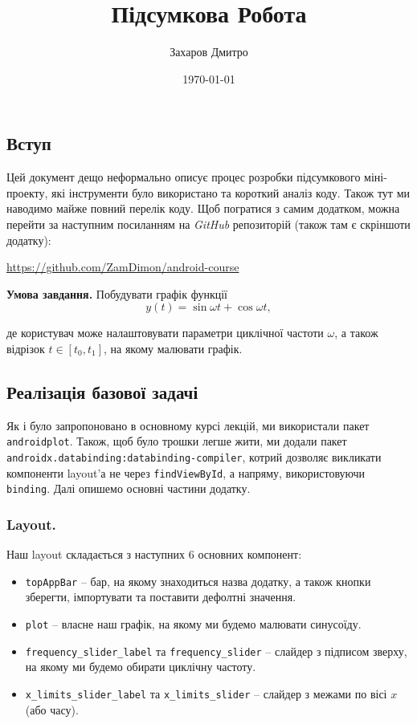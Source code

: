 \documentclass[oneside,solution]{android-assign}
\title{Підсумкова Робота}
\author{Захаров Дмитро}
\date{\today}
\begin{document}
\maketitle

\subsection{Вступ} Цей документ дещо неформально описує процес розробки підсумкового міні-проекту, які інструменти було використано та короткий аналіз коду. Також тут ми наводимо майже повний перелік коду. Щоб погратися з самим додатком, можна перейти за наступним посиланням на \textit{GitHub} репозиторій (також там є скріншоти додатку):

\begin{center}
\url{https://github.com/ZamDimon/android-course}
\end{center}

\textbf{Умова завдання.} Побудувати графік функції
\begin{equation*}
    y(t) = \sin \omega t + \cos \omega t,
\end{equation*}

де користувач може налаштовувати параметри циклічної частоти $\omega$, а також відрізок $t \in [t_0,t_1]$, на якому малювати графік.

\subsection{Реалізація базової задачі}

Як і було запропоновано в основному курсі лекцій, ми використали пакет \texttt{androidplot}. Також, щоб було трошки легше жити, ми додали пакет \texttt{androidx.databinding:databinding-compiler}, котрий дозволяє викликати компоненти layout'а не через \texttt{findViewById}, а напряму, використовуючи \texttt{binding}. Далі опишемо основні частини додатку.

\subsubsection{Layout.} Наш layout складається з наступних 6 основних компонент:
\begin{itemize}
    \item \texttt{topAppBar} -- бар, на якому знаходиться назва додатку, а також кнопки зберегти, імпортувати та поставити дефолтні значення.
    \item \texttt{plot} -- власне наш графік, на якому ми будемо малювати синусоїду.
    \item \texttt{frequency\_slider\_label} та \texttt{frequency\_slider} -- слайдер з підписом зверху, на якому ми будемо обирати циклічну частоту.
    \item \texttt{x\_limits\_slider\_label} та \texttt{x\_limits\_slider} -- слайдер з межами по вісі $x$ (або часу).
\end{itemize}
\end{document}
